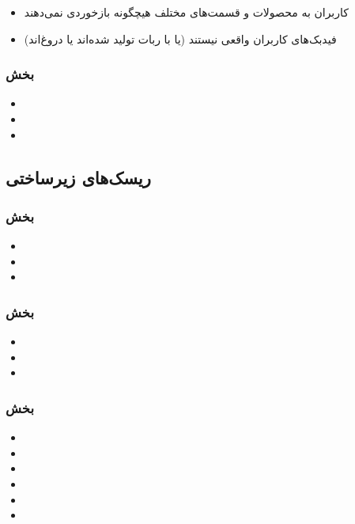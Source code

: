 \begin{itemize}
\item 
کاربران به محصولات و قسمت‌‌های مختلف هیچگونه بازخوردی نمی‌دهند
\item 
فید‌بک‌های کاربران واقعی نیستند (یا با ربات تولید شده‌اند یا دروغ‌اند)
\end{itemize}

\subsubsection{بخش }
\begin{itemize}
\item

\item 

\item  

\end{itemize}

\subsection{ریسک‌های زیرساختی}
\subsubsection{بخش }
\begin{itemize}
\item

\item 

\item 
 
\end{itemize}

\subsubsection{بخش }
\begin{itemize}
\item

\item 

\item 
 
\end{itemize}

\subsubsection{بخش }
\begin{itemize}
\item

\item 

\item 
 
\item

\item 

\item  
\end{itemize}

